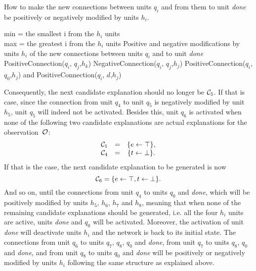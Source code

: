 \begin{tcolorbox}
\begin{algorithm}
\label{alg:dependencies}
\normalfont 
How to make the new connections between units $q_i$ and from them to unit \textit{done} be positively or negatively modified by units $h_i$.

\begin{algorithmic}[1]
\REQUIRE min = the smallest i from the $h_i$ units\\
\hspace{0.5cm} max = the greatest i from the $h_i$ units
\ENSURE Positive and negative modifications by units $h_i$ of the new connections between units $q_i$ and to unit \textit{done}
\bigskip
{}
				\STATE PositiveConnection($q_i$, $q_j$,$h_k$)
			\ENDFOR
			\STATE NegativeConnection($q_i$, $q_j$,$h_j$)
		\ENDFOR
			\STATE PositiveConnection($q_i$, $q_0$,$h_j$) and PositiveConnection($q_i$, $d$,$h_j$)
		\ENDFOR
	\ENDFOR
\ENDWHILE
\end{algorithmic}
\end{algorithm}
\end{tcolorbox}

Consequently, the next candidate explanation should no longer be $\mathcal{C}_5$. If that is case, since the connection from unit $q_4$ to unit $q_5$ is negatively modified by unit $h_5$, unit $q_5$ will indeed not be activated. Besides this, unit $q_6$ is activated when none of the following two candidate explanations are actual explanations for the observation~$\mathcal{O}$:
\[
\begin{array}{ccc}
\mathcal{C}_1 &=& \{e \leftarrow \top\},\\
\mathcal{C}_4 &=& \{t \leftarrow \bot\}.
\end{array}
\]
If that is the case, the next candidate explanation to be generated is now
\[
\mathcal{C}_6 = \{e \leftarrow \top, t \leftarrow \bot\}.
\]
And so on, until the connections from unit $q_4$ to units $q_0$ and \textit{done}, which will be positively modified by units $h_5$, $h_6$, $h_7$ and $h_8$, meaning that when none of the remaining candidate explanations should be generated, i.e. all the four $h_i$ units are active, units \textit{done} and $q_0$ will be activated. Moreover, the activation of unit \textit{done} will deactivate units $h_i$ and the network is back to its initial state. The connections from unit $q_6$ to units $q_7$, $q_8$, $q_0$ and \textit{done}, from unit $q_7$ to units $q_8$, $q_0$ and \textit{done}, and from unit $q_8$ to units $q_0$ and \textit{done} will be positively or negatively modified by units $h_i$ following the same structure as explained above.


